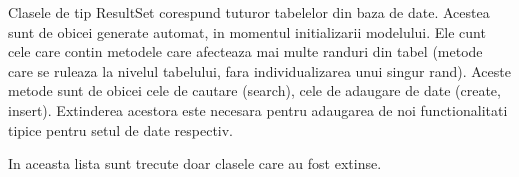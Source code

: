 Clasele de tip ResultSet corespund tuturor tabelelor din baza de date. Acestea sunt de obicei generate automat, in momentul initializarii modelului. Ele cunt cele care contin metodele care afecteaza mai multe randuri din tabel (metode care se ruleaza la nivelul tabelului, fara individualizarea unui singur rand). Aceste metode sunt de obicei cele de cautare (search), cele de adaugare de date (create, insert). Extinderea acestora este necesara pentru adaugarea de noi functionalitati tipice pentru setul de date respectiv. 

In aceasta lista sunt trecute doar clasele care au fost extinse.